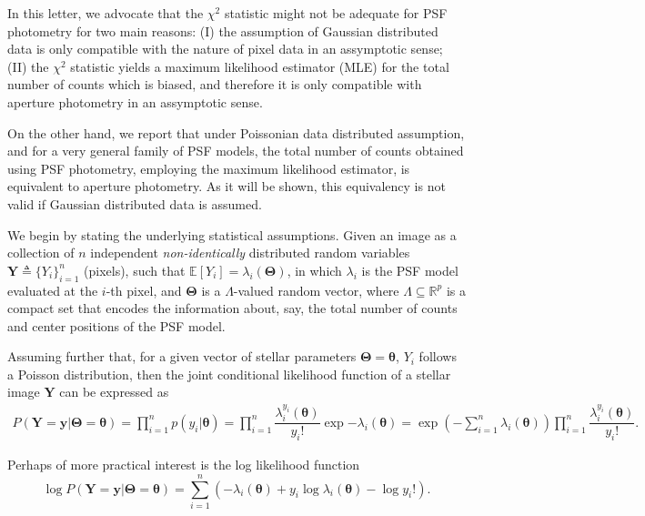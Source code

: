 \documentclass{rnaastex}
\begin{document}
In this letter, we advocate that the $\chi^2$ statistic might not be adequate
for PSF photometry for two main reasons: (I) the assumption of Gaussian
distributed data is only compatible with the nature of pixel data in an
assymptotic sense; (II) the $\chi^2$ statistic yields a maximum likelihood
estimator (MLE) for the total number of counts which is biased, and therefore
it is only compatible with aperture photometry in an assymptotic sense.

On the other hand, we report that under Poissonian data distributed assumption,
and for a very general family of PSF models, the total number of counts
obtained using PSF photometry, employing the maximum likelihood estimator, is
equivalent to aperture photometry. As it will be shown, this equivalency is not
valid if Gaussian distributed data is assumed.

We begin by stating the underlying statistical assumptions.
Given an image as a collection of $n$ independent \emph{non-identically}
distributed random variables $\bm{Y} \triangleq \{Y_i\}_{i=1}^{n}$ (pixels),
such that $\mathbb{E}\left[Y_i\right] = \lambda_i(\bm{\Theta})$, in which
$\lambda_i$ is the PSF model evaluated at the $i$-th pixel, and $\bm{\Theta}$
is a $\Lambda$-valued random vector, where $\Lambda \subseteq \mathbb{R}^p$ is
a compact set that encodes the information about, say, the total number of
counts and center positions of the PSF model.

Assuming further that, for a given vector of stellar parameters
$\bm{\Theta} = \bm{\theta}$, $Y_i$ follows a Poisson distribution, then the
joint conditional likelihood function of a stellar image $\bm{Y}$ can be
expressed as~\citep{grimmett:2001}
\begin{align}
    P(\bm{Y} = \bm{y} | \bm{\Theta} = \bm{\theta}) =
    \prod_{i=1}^{n} p(y_i | \bm{\theta}) =
    \prod_{i=1}^{n}\dfrac{\lambda_i^{y_i}(\bm{\theta})}{y_i!}\exp{-\lambda_i(\bm{\theta})} =
    \exp\left({-\sum_{i=1}^{n}\lambda_i(\bm{\theta})}\right)\prod_{i=1}^{n}\dfrac{\lambda_i^{y_i}(\bm{\theta})}{y_i!}.
\end{align}

Perhaps of more practical interest is the log likelihood function
\begin{equation}
    \log P(\bm{Y} = \bm{y} | \bm{\Theta} = \bm{\theta}) =
    \sum_{i=1}^{n}\left(- \lambda_i(\bm{\theta})
    + y_i\log\lambda_i(\bm{\theta}) - \log y_i !\right).
\end{equation}
\end{document}
